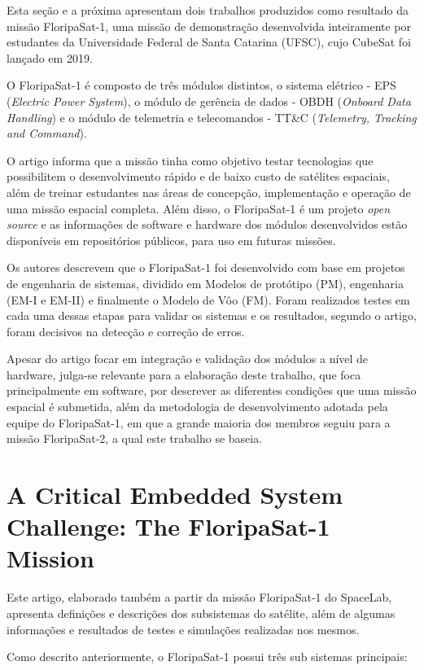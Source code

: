 Esta seção e a próxima apresentam dois trabalhos produzidos como resultado da missão FloripaSat-1, uma missão de demonstração desenvolvida inteiramente por estudantes da Universidade Federal de Santa Catarina (UFSC), cujo CubeSat foi lançado em 2019.

O FloripaSat-1 é composto de três módulos distintos, o sistema elétrico - EPS (\textit{Electric Power System}), o módulo de gerência de dados - OBDH (\textit{Onboard Data Handling}) e o módulo de telemetria e telecomandos - TT\&C (\textit{Telemetry, Tracking and Command}).

O artigo informa que a missão tinha como objetivo testar tecnologias que possibilitem o desenvolvimento rápido e de baixo custo de satélites espaciais, além de treinar estudantes nas áreas de concepção, implementação e operação de uma missão espacial completa. Além disso, o FloripaSat-1 é um projeto \textit{open source} e as informações de software e hardware dos módulos desenvolvidos estão disponíveis em repositórios públicos, para uso em futuras missões.

Os autores descrevem que o FloripaSat-1 foi desenvolvido com base em projetos de engenharia de sistemas, dividido em Modelos de protótipo (PM), engenharia (EM-I e EM-II) e finalmente o Modelo de Vôo (FM). Foram realizados testes em cada uma dessas etapas para validar os sistemas e os resultados, segundo o artigo, foram decisivos na detecção e correção de erros.

Apesar do artigo focar em integração e validação dos módulos a nível de hardware, julga-se relevante para a elaboração deste trabalho, que foca principalmente em software, por descrever as diferentes condições que uma missão espacial é submetida, além da metodologia de desenvolvimento adotada pela equipe do FloripaSat-1, em que a grande maioria dos membros seguiu para a missão FloripaSat-2, a qual este trabalho se baseia.

\section{A Critical Embedded System Challenge: The
FloripaSat-1 Mission \cite{marcelino2020-1}}

Este artigo, elaborado também a partir da missão FloripaSat-1 do SpaceLab, apresenta definições e descrições dos subsistemas do satélite, além de algumas informações e resultados de testes e simulações realizadas nos mesmos.

Como descrito anteriormente, o FloripaSat-1 possui três sub sistemas principais:

